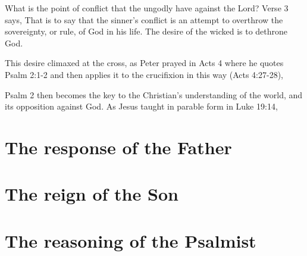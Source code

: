 What is the point of conflict that the ungodly have against the Lord?
Verse 3 says,
That is to say that the sinner's conflict is an attempt to
    overthrow the sovereignty, or rule, of God in his life.
The desire of the wicked is to dethrone God.

This desire climaxed at the cross, 
    as Peter prayed in Acts 4 where he quotes Psalm 2:1-2
    and then applies it to the crucifixion in this way (Acts 4:27-28),

Psalm 2 then becomes the key to the Christian's understanding of the world,
    and its opposition against God.
As Jesus taught in parable form in Luke 19:14,


\section{The response of the Father}
\section{The reign of the Son}
\section{The reasoning of the Psalmist}
